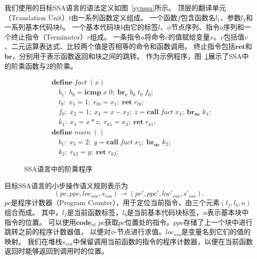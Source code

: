 我们使用的目标SSA语言的语法定义如图~\ref{synssa}所示。
顶层的翻译单元（Translation Unit）$t$由一系列函数定义组成。
一个函数$f$包含函数名$l_1$、参数$l_2$和一系列基本代码块$\overline{b}$。
一个基本代码块$b$由它的标签$l$、$\overline{\phi}$节点序列、指令$\overline{a}$序列和一个终止指令（Terminator）$r$组成。
一条指令$a$将命令$c$的值赋给变量$x$。$c$包括值$v$、二元运算表达式、比较两个值是否相等的命令和函数调用。
终止指令包括$\mathbf{ret}$和$\mathbf{br}$，分别用于表示函数返回和块之间的跳转。
作为示例程序，图~\ref{factssa}展示了SSA中的阶乘函数与2的阶乘。

\begin{figure}[ht]
    \centering
    \begin{equation}
        \nonumber
        \begin{aligned}
            & \mathbf{define}\; fact\; (x)\\
            & \quad b_1:\; b_0 = \mathbf{icmp}\; x\; 0;\; \mathbf{br_c}\; b_0\; t_0\; f_0; \\
            & \quad t_0:\; x_1 = 1;\; r_{t0} = x_1;\; \mathbf{ret}\; r_{t0}; \\
            & \quad f_0:\; x_2 = 1;\; x_4 = x - x_2;\; z = \mathbf{call}\; fact\; x_4;\; \mathbf{br_{uc}}\; k_1; \\
            & \quad k_1:\; x_3 = x*z;\; r_{k1} = x_3;\; \mathbf{ret}\; r_{k1}; \\
            & \mathbf{define}\; main\; ( )\\
            & \quad b_1:\; x_5 = 2;\; y = \mathbf{call}\; fact\; x_5;\; \mathbf{br_{uc}}\; k_2;\\
            & \quad k_2:\; r_{k2} = y;\; \mathbf{ret}\; r_{k2};
        \end{aligned}
    \end{equation}
    \caption{SSA语言中的阶乘程序}\label{factssa}
\end{figure}

目标SSA语言的小步操作语义规则表示为
\begin{equation}
(pc, ppc, loc_{ssa}, s_{ssa}) \rightarrow (pc', ppc', loc'_{ssa}, s'_{ssa}).
\end{equation}
$pc$是程序计数器（Program Counter），用于定位当前指令，由三个元素$(l_{f}, l_b, n)$组合而成。
其中，$l_{f}$是当前函数标签，$l_b$是当前基本代码块标签，$n$表示基本块中指令的位置。
可以使用$\mathbf{code}_{at}\; pc$获取$pc$位置处的指令。$ppc$存储了上一个块中进行跳转之前的程序计数器值，
以便对$\phi$-节点进行求值。$loc_{ssa}$是变量名到它们的值的映射。
我们在堆栈$s_{ssa}$中保留调用当前函数的指令的程序计数器，以便在当前函数返回时能够返回到调用时的位置。

